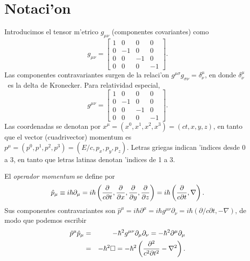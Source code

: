 \section{Notaci'on}

Introducimos el tensor m'etrico $g_{\mu \nu }$ (componentes covariantes)
como 
\begin{equation}
g_{\mu \nu }=\left[ 
\begin{array}{cccc}
1 & 0 & 0 & 0 \\ 
0 & -1 & 0 & 0 \\ 
0 & 0 & -1 & 0 \\ 
0 & 0 & 0 & -1
\end{array}
\right] .
\end{equation}
Las componentes contravariantes surgen de la relaci'on $g^{\mu \sigma
}g_{\sigma \nu }=\delta _{\nu }^{\mu }$, en donde $\delta _{\nu }^{\mu }$\
es la delta de Kronecker. Para relatividad especial, 
\begin{equation}
g^{\mu \nu }=\left[ 
\begin{array}{cccc}
1 & 0 & 0 & 0 \\ 
0 & -1 & 0 & 0 \\ 
0 & 0 & -1 & 0 \\ 
0 & 0 & 0 & -1
\end{array}
\right] .
\end{equation}
Las coordenadas se denotan por $x^{\mu }=\left(
x^{0},x^{1},x^{2},x^{3}\right) =\left( ct,x,y,z\right) $, en tanto que el
vector (cuadrivector) momentum es $p^{\mu }=\left(
p^{0},p^{1},p^{2},p^{3}\right) =\left( E/c,p_{x},p_{y},p_{z}\right) $.
Letras griegas indican 'indices desde 0 a 3, en tanto que letras latinas
denotan 'indices de 1 a 3.

El \emph{operador momentum} se define por 
\begin{equation}
\hat{p}_{\mu }\equiv i\hbar \partial _{\mu }=i\hbar \left( \frac{%
\partial }{c\partial t},\frac{\partial }{\partial x},\frac{\partial }{%
\partial y},\frac{\partial }{\partial z}\right) =i\hbar \left( \frac{%
\partial }{c\partial t},\nabla \right) .
\end{equation}
Sus componentes contravariantes son $\hat{p}^{\mu }=i\hbar \partial ^{\mu
}=i\hbar g^{\mu \nu }\partial _{\nu }=i\hbar \left( \partial /c\partial
t,-\nabla \right) $, de modo que podemos escribir 
\begin{eqnarray}
\hat{p}^{\mu }\hat{p}_{\mu } &=&-\hbar ^{2}g^{\mu \nu }\partial _{\mu
}\partial _{\nu }=-\hbar ^{2}\partial ^{\mu }\partial _{\mu } \notag \\
&=&-\hbar ^{2}\square =-\hbar ^{2}\left( \frac{\partial ^{2}}{%
c^{2}\partial t^{2}}-\nabla ^{2}\right) . \label{Mom-Operator}
\end{eqnarray}


